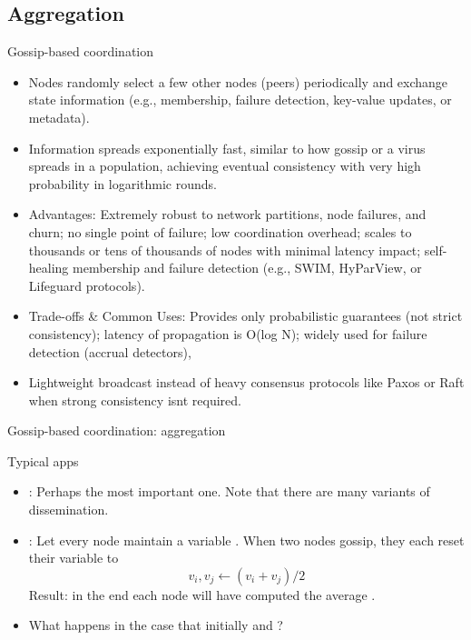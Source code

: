 \subsection{Aggregation}
\begin{slide}{Gossip-based coordination}
  \begin{itemize}
    \item Nodes randomly select a few other nodes (peers) periodically and
          exchange state information (e.g., membership, failure detection, key-value updates,
          or metadata).
    \item Information spreads exponentially fast, similar to how gossip or a
          virus spreads in a population, achieving eventual consistency with very high probability
          in logarithmic rounds.
    \item Advantages: Extremely robust to network partitions, node failures,
          and churn; no single point of failure; low coordination overhead; scales to thousands or tens of thousands of nodes with minimal latency impact; self-healing membership and failure detection (e.g., SWIM, HyParView, or Lifeguard protocols).
    \item Trade-offs \& Common Uses: Provides only probabilistic guarantees
          (not strict consistency); latency of propagation is O(log N);
          widely used for failure detection (accrual detectors),
    \item Lightweight broadcast instead of heavy consensus protocols
          like Paxos or Raft when strong consistency isnt required.
  \end{itemize}
\end{slide}

\begin{frame}{Gossip-based coordination: aggregation}
  \begin{block}{Typical apps}
    \begin{itemize}
      \item {}: Perhaps the most important one. Note that there are many variants of
            dissemination.
      \item {}: Let every node  maintain a variable . When two nodes gossip, they
            each reset their variable to\[{v_i},{v_j} \leftarrow ({v_i} + {v_j}) /2\] Result: in the end
            each node will have computed the average .
      \item What happens in the case that initially  and ?
    \end{itemize}
  \end{block}
\end{frame}
